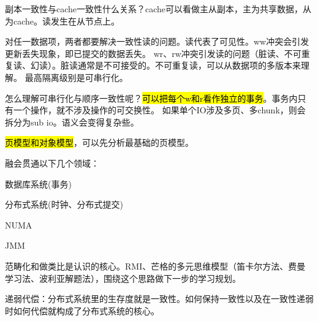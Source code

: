 副本一致性与cache一致性什么关系？cache可以看做主从副本，主为共享数据，从为cache。读发生在从节点上。

对任一数据项，两者都要解决一致性读的问题。读代表了可见性。ww冲突会引发更新丢失现象，即已提交的数据丢失。
wr、rw冲突引发读的问题（脏读、不可重复读、幻读）。脏读通常是不可接受的。不可重复读，可以从数据项的多版本来理解。
最高隔离级别是可串行化。

怎么理解可串行化与顺序一致性呢？\hl{可以把每个w和r看作独立的事务}。事务内只有一个操作，就不涉及操作的可交换性。
如果单个IO涉及多页、多chunk，则会拆分为sub io。语义会变得复杂些。

\hl{页模型和对象模型}，可以先分析最基础的页模型。

融会贯通以下几个领域：
\begin{enumbox}
\item 数据库系统(事务)
\item 分布式系统(时钟、分布式提交)
\item NUMA
\item JMM
\end{enumbox}

\hrulefill

范畴化和做类比是认识的核心。RMI、芒格的多元思维模型（笛卡尔方法、费曼学习法、波利亚解题法），围绕这个思路做下一步的学习规划。

递弱代偿：分布式系统里的生存度就是一致性。如何保持一致性以及在一致性递弱时如何代偿就构成了分布式系统的核心。

